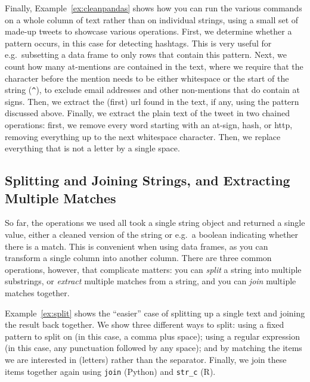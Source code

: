 Finally, Example~\ref{ex:cleanpandas} shows how you can run the various commands on a whole column of text rather than on individual strings,
using  a small set of made-up tweets to showcase various operations.
First, we determine whether a pattern occurs, in this case for detecting hashtags.
This is very useful for e.g.\ subsetting a data frame to only rows that contain this pattern.
Next, we count how many at-mentions are contained in the text, where we require that the character before the mention needs to be either whitespace or the start of the string (\verb|^|), to exclude email addresses and other non-mentions that do contain at signs.
Then, we extract the (first) url found in the text, if any, using the pattern discussed above.
Finally, we extract the plain text of the tweet in two chained operations:
first, we remove every word starting with an at-sign, hash, or http, removing everything up to the next whitespace character.
Then, we replace everything that is not a letter by a single space.



\subsection{Splitting and Joining Strings, and Extracting Multiple Matches}\label{sec:regexadvanced}

So far, the operations we used all took a single string object and returned a single value,
either a cleaned version of the string or e.g.\ a boolean indicating whether there is a match.
This is convenient when using data frames, as you can transform a single column into another column.
There are three common operations, however, that complicate matters:
you can \emph{split} a string into multiple substrings, or \emph{extract} multiple matches from a string,
and you can \emph{join} multiple matches together.


Example~\ref{ex:split} shows the ``easier'' case of splitting up a single text and joining the result back together.
We show three different ways to split: using a fixed pattern to split on (in this case, a comma plus space);
using a regular expression (in this case, any punctuation followed by any space);
and by matching the items we are interested in (letters) rather than the separator.
Finally, we join these items together again using \texttt{join} (Python) and \texttt{str\_c} (R).

